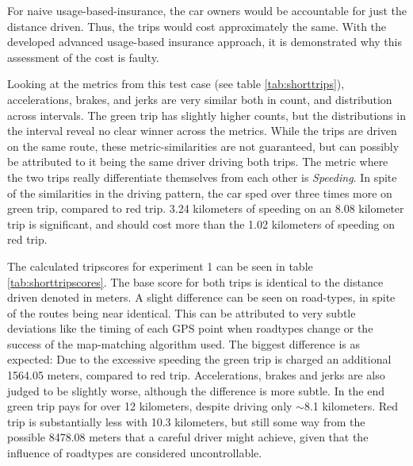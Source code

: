 For naive usage-based-insurance, the car owners would be accountable for just the distance driven. Thus, the trips would cost approximately the same. With the developed advanced usage-based insurance approach, it is demonstrated why this assessment of the cost is faulty.

Looking at the metrics from this test case (see table  \ref{tab:shorttrips}), accelerations, brakes, and jerks are very similar both in count, and distribution across intervals. The green trip has slightly higher counts, but the distributions in the interval reveal no clear winner across the metrics. While the trips are driven on the same route, these metric-similarities are not guaranteed, but can possibly be attributed to it being the same driver driving both trips. The metric where the two trips really differentiate themselves from each other is \textit{Speeding}. In spite of the similarities in the driving pattern, the car sped over three times more on green trip, compared to red trip. 3.24 kilometers of speeding on an 8.08 kilometer trip is significant, and should cost more than the 1.02 kilometers of speeding on red trip.

The calculated tripscores for experiment 1 can be seen in table \ref{tab:shorttripscores}. The base score for both trips is identical to the distance driven denoted in meters. A slight difference can be seen on road-types, in spite of the routes being near identical. This can be attributed to very subtle deviations like the timing of each GPS point when roadtypes change or the success of the map-matching algorithm used. The biggest difference is as expected: Due to the excessive speeding the green trip is charged an additional 1564.05 meters, compared to red trip. Accelerations, brakes and jerks are also judged to be slightly worse, although the difference is more subtle. In the end green trip pays for over 12 kilometers, despite driving only $\sim$8.1 kilometers. Red trip is substantially less with 10.3 kilometers, but still some way from the possible 8478.08 meters that a careful driver might achieve, given that the influence of roadtypes are considered uncontrollable.

